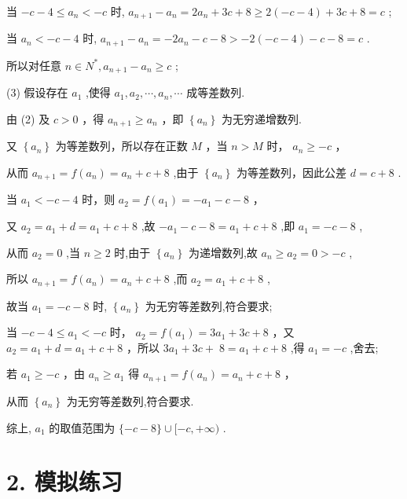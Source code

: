 \documentclass[10pt]{article}
\newcommand*\circled[1]{\tikz[baseline=(char.base)]{\node[shape=circle,draw,inner sep=1.5pt] (char) {\small #1};}}
\begin{document}
当 \(- c - 4 \leq  {a}_{n} <  - c\) 时, \({a}_{n + 1} - {a}_{n} = 2{a}_{n} + {3c} + 8 \geq  2\left( {-c - 4}\right)  + {3c} + 8 = c\) ;

当 \({a}_{n} <  - c - 4\) 时, \({a}_{n + 1} - {a}_{n} =  - 2{a}_{n} - c - 8 >  - 2\left( {-c - 4}\right)  - c - 8 = c\) .

所以对任意 \(n \in  {N}^{ * },{a}_{n + 1} - {a}_{n} \geq  c\) ;

(3) 假设存在 \({a}_{1}\) ,使得 \({a}_{1},{a}_{2},\cdots ,{a}_{n},\cdots\) 成等差数列.

由 (2) 及 \(c > 0\) ，得 \({a}_{n + 1} \geq  {a}_{n}\) ，即 \(\left\{  {a}_{n}\right\}\) 为无穷递增数列.

又 \(\left\{  {a}_{n}\right\}\) 为等差数列，所以存在正数 \(M\) ，当 \(n > M\) 时， \({a}_{n} \geq   - c\) ，

从而 \({a}_{n + 1} = f\left( {a}_{n}\right)  = {a}_{n} + c + 8\) ,由于 \(\left\{  {a}_{n}\right\}\) 为等差数列，因此公差 \(d = c + 8\) .

 \circled{1}  当 \({a}_{1} <  - c - 4\) 时，则 \({a}_{2} = f\left( {a}_{1}\right)  =  - {a}_{1} - c - 8\) ，

又 \({a}_{2} = {a}_{1} + d = {a}_{1} + c + 8\) ,故 \(- {a}_{1} - c - 8 = {a}_{1} + c + 8\) ,即 \({a}_{1} =  - c - 8\) ,

从而 \({a}_{2} = 0\) ,当 \(n \geq  2\) 时,由于 \(\left\{  {a}_{n}\right\}\) 为递增数列,故 \({a}_{n} \geq  {a}_{2} = 0 >  - c\) ,

所以 \({a}_{n + 1} = f\left( {a}_{n}\right)  = {a}_{n} + c + 8\) ,而 \({a}_{2} = {a}_{1} + c + 8\) ,

故当 \({a}_{1} =  - c - 8\) 时, \(\left\{  {a}_{n}\right\}\) 为无穷等差数列,符合要求;

 \circled{2}  当 \(- c - 4 \leq  {a}_{1} <  - c\) 时， \({a}_{2} = f\left( {a}_{1}\right)  = 3{a}_{1} + {3c} + 8\) ，又 \({a}_{2} = {a}_{1} + d = {a}_{1} + c + 8\) ，所以 \(3{a}_{1} + {3c} + \; 8 = {a}_{1} + c + 8\) ,得 \({a}_{1} =  - c\) ,舍去;

 \circled{3}  若 \({a}_{1} \geq   - c\) ，由 \({a}_{n} \geq  {a}_{1}\) 得 \({a}_{n + 1} = f\left( {a}_{n}\right)  = {a}_{n} + c + 8\) ，

从而 \(\left\{  {a}_{n}\right\}\) 为无穷等差数列,符合要求.

综上, \({a}_{1}\) 的取值范围为 \(\{  - c - 8\}  \cup  \lbrack  - c, + \infty )\) .

\section*{2. 模拟练习}
\end{document}
